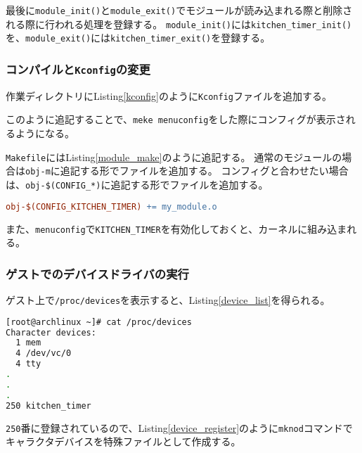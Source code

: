 \documentclass[main]{subfiles}
\begin{document}
最後に\texttt{module\_init()}と\texttt{module\_exit()}でモジュールが読み込まれる際と削除される際に行われる処理を登録する。
\texttt{module\_init()}には\texttt{kitchen\_timer\_init()}を、\texttt{module\_exit()}には\texttt{kitchen\_timer\_exit()}を登録する。

\subsubsection{コンパイルと\texttt{Kconfig}の変更}

作業ディレクトリにListing\ref{kconfig}のように\texttt{Kconfig}ファイルを追加する。



このように追記することで、\texttt{meke menuconfig}をした際にコンフィグが表示されるようになる。

\texttt{Makefile}にはListing\ref{module_make}のように追記する。
通常のモジュールの場合は\texttt{obj-m}に追記する形でファイルを追加する。
コンフィグと合わせたい場合は、\texttt{obj-\$(CONFIG\_*)}に追記する形でファイルを追加する。

\begin{lstlisting}[label=module_make,caption=モジュールの\texttt{make},language=make]
obj-$(CONFIG_KITCHEN_TIMER) += my_module.o
\end{lstlisting}

また、\texttt{menuconfig}で\texttt{KITCHEN\_TIMER}を有効化しておくと、カーネルに組み込まれる。

\subsubsection{ゲストでのデバイスドライバの実行}

ゲスト上で\texttt{/proc/devices}を表示すると、Listing\ref{device_list}を得られる。

\begin{lstlisting}[label=device_list,caption=\texttt{/proc/devices}を表示する,language=sh]
[root@archlinux ~]# cat /proc/devices
Character devices:
  1 mem
  4 /dev/vc/0
  4 tty
.
.
.
250 kitchen_timer
\end{lstlisting}

\texttt{250}番に登録されているので、Listing\ref{device_register}のように\texttt{mknod}コマンドでキャラクタデバイスを特殊ファイルとして作成する。
\end{document}
